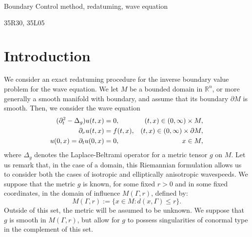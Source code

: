 \documentclass[final,leqno]{siamart1116}
\begin{document}
\begin{keywords}
  Boundary Control method, redatuming,  wave equation
\end{keywords}

\begin{AMS}
  35R30, 35L05
\end{AMS}

\section{Introduction}

We consider an exact redatuming procedure for the inverse boundary
value problem for the wave equation.
We let $M$ be a bounded domain in ${\mathbb{R}}^n$, or more generally a smooth manifold with boundary, and assume that its boundary ${\partial} M$ is smooth. Then, we consider
the wave equation
\begin{align}
  \label{eqn:1stForwardProb}
  (\partial_t^2 - {\Delta_{g}})u(t,x) &= 0, & (t,x) \in (0, \infty) \times M,\\ 
  {{\partial}_{\nu}} u(t,x) &= f(t,x), & (t,x) \in (0,\infty) \times {\partial} M,\notag\\
  u(0,x) = \partial_t u(0,x) &= 0, & x \in M, \notag
\end{align}
where $\Delta_g$ denotes the Laplace-Beltrami operator for a metric tensor $g$ on $M$. Let us remark that, in the case of a domain, this Riemannian formulation allows us to consider both the cases of isotropic and elliptically anisotropic wavespeeds.   We suppose that the metric $g$ is known, for some fixed $r > 0$
and in some fixed coordinates, in the domain of influence
$M(\Gamma,r)$, defined by:
\begin{equation}
    M(\Gamma,r) := \{ x \in M : d(x,\Gamma) \leq r\}.
\end{equation}
Outside of this set, the metric will be assumed to be unknown. 
We suppose that $g$ is smooth in $M(\Gamma,r)$, but allow for $g$ to possess singularities of
conormal type in the complement of this set.
\end{document}
